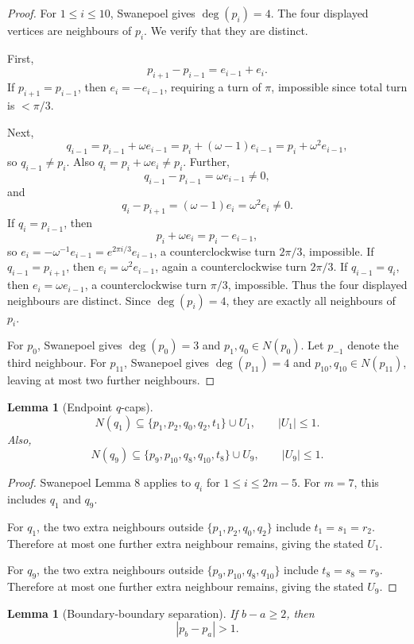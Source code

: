 \documentclass[11pt]{article}
\newtheorem{lemma}[theorem]{Lemma}
\begin{document}
\begin{proof}
For $1\le i\le10$, Swanepoel gives $\deg(p_i)=4$. The four displayed vertices are neighbours of $p_i$. We verify that they are distinct.

First,
\[
 p_{i+1}-p_{i-1}=e_{i-1}+e_i.
\]
If $p_{i+1}=p_{i-1}$, then $e_i=-e_{i-1}$, requiring a turn of $\pi$, impossible since total turn is $<\pi/3$.

Next,
\[
 q_{i-1}=p_{i-1}+\omega e_{i-1}=p_i+(\omega-1)e_{i-1}=p_i+\omega^2e_{i-1},
\]
so $q_{i-1}\ne p_i$. Also $q_i=p_i+\omega e_i\ne p_i$.
Further,
\[
 q_{i-1}-p_{i-1}=\omega e_{i-1}\ne0,
\]
and
\[
 q_i-p_{i+1}=(\omega-1)e_i=\omega^2e_i\ne0.
\]
If $q_i=p_{i-1}$, then
\[
 p_i+\omega e_i=p_i-e_{i-1},
\]
so $e_i=-\omega^{-1}e_{i-1}=e^{2\pi i/3}e_{i-1}$, a counterclockwise turn $2\pi/3$, impossible.
If $q_{i-1}=p_{i+1}$, then $e_i=\omega^2e_{i-1}$, again a counterclockwise turn $2\pi/3$.
If $q_{i-1}=q_i$, then $e_i=\omega e_{i-1}$, a counterclockwise turn $\pi/3$, impossible.
Thus the four displayed neighbours are distinct. Since $\deg(p_i)=4$, they are exactly all neighbours of $p_i$.

For $p_0$, Swanepoel gives $\deg(p_0)=3$ and $p_1,q_0\in N(p_0)$. Let $p_{-1}$ denote the third neighbour. For $p_{11}$, Swanepoel gives $\deg(p_{11})=4$ and $p_{10},q_{10}\in N(p_{11})$, leaving at most two further neighbours.
\end{proof}

\begin{lemma}[Endpoint $q$-caps]\label{lem:q-caps}
\[
 N(q_1)\subseteq \{p_1,p_2,q_0,q_2,t_1\}\cup U_1,
 \qquad |U_1|\le1.
\]
Also,
\[
 N(q_9)\subseteq \{p_9,p_{10},q_8,q_{10},t_8\}\cup U_9,
 \qquad |U_9|\le1.
\]
\end{lemma}

\begin{proof}
Swanepoel Lemma 8 applies to $q_i$ for $1\le i\le 2m-5$. For $m=7$, this includes $q_1$ and $q_9$.

For $q_1$, the two extra neighbours outside $\{p_1,p_2,q_0,q_2\}$ include $t_1=s_1=r_2$. Therefore at most one further extra neighbour remains, giving the stated $U_1$.

For $q_9$, the two extra neighbours outside $\{p_9,p_{10},q_8,q_{10}\}$ include $t_8=s_8=r_9$. Therefore at most one further extra neighbour remains, giving the stated $U_9$.
\end{proof}

\begin{lemma}[Boundary-boundary separation]\label{lem:bb}
If $b-a\ge2$, then
\[
 |p_b-p_a|>1.
\]
\end{lemma}
\end{document}
